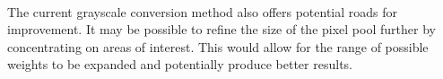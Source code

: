 \documentclass[10pt,twocolumn]{article}
\begin{document}
	\paragraph{} The current grayscale conversion method also offers potential roads for improvement.  It may be possible to refine the size of the pixel pool further by concentrating on areas of interest.  This would allow for the range of possible weights to be expanded and potentially produce better results.

\nocite{*}


\end{document}
